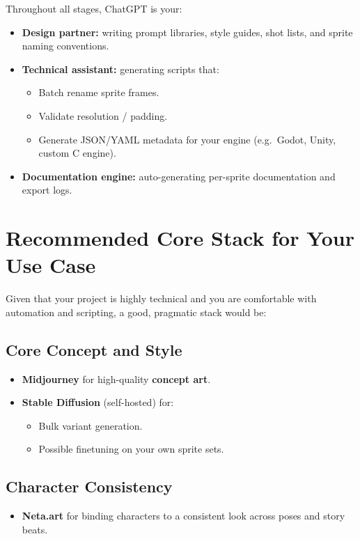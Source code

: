 \documentclass[11pt]{article}
\begin{document}
Throughout all stages, ChatGPT is your:
\begin{itemize}
    \item \textbf{Design partner:} writing prompt libraries, style guides, shot lists, and sprite naming conventions.
    \item \textbf{Technical assistant:} generating scripts that:
    \begin{itemize}
        \item Batch rename sprite frames.
        \item Validate resolution / padding.
        \item Generate JSON/YAML metadata for your engine (e.g.\ Godot, Unity, custom C engine).
    \end{itemize}
    \item \textbf{Documentation engine:} auto-generating per-sprite documentation and export logs.
\end{itemize}

\section{Recommended Core Stack for Your Use Case}

Given that your project is highly technical and you are comfortable with automation and scripting, a good, pragmatic stack would be:

\subsection{Core Concept and Style}

\begin{itemize}
    \item \textbf{Midjourney} for high-quality \textbf{concept art}.
    \item \textbf{Stable Diffusion} (self-hosted) for:
    \begin{itemize}
        \item Bulk variant generation.
        \item Possible finetuning on your own sprite sets.
    \end{itemize}
\end{itemize}

\subsection{Character Consistency}

\begin{itemize}
    \item \textbf{Neta.art} for binding characters to a consistent look across poses and story beats.
\end{itemize}
\end{document}
